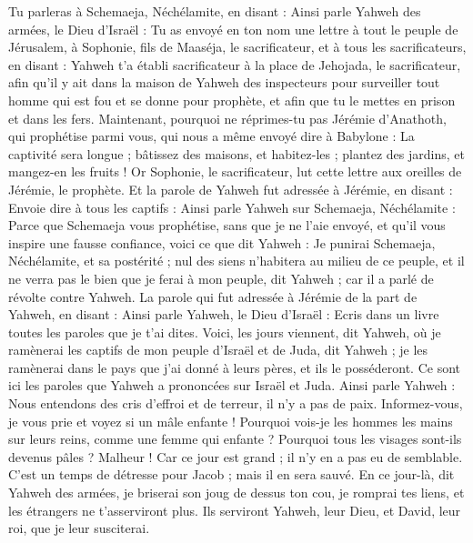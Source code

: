 \begin{multicols}{2}
Tu parleras à Schemaeja, Néchélamite, en disant :
Ainsi parle Yahweh des armées, le Dieu d'Israël : Tu as envoyé en ton nom une lettre à tout le peuple de Jérusalem, à Sophonie, fils de Maaséja, le sacrificateur, et à tous les sacrificateurs, en disant :
Yahweh t'a établi sacrificateur à la place de Jehojada, le sacrificateur, afin qu'il y ait dans la maison de Yahweh des inspecteurs pour surveiller tout homme qui est fou et se donne pour prophète, et afin que tu le mettes en prison et dans les fers.
Maintenant, pourquoi ne réprimes-tu pas Jérémie d'Anathoth, qui prophétise parmi vous,
qui nous a même envoyé dire à Babylone : La captivité sera longue ; bâtissez des maisons, et habitez-les ; plantez des jardins, et mangez-en les fruits !
Or Sophonie, le sacrificateur, lut cette lettre aux oreilles de Jérémie, le prophète.
Et la parole de Yahweh fut adressée à Jérémie, en disant :
Envoie dire à tous les captifs : Ainsi parle Yahweh sur Schemaeja, Néchélamite : Parce que Schemaeja vous prophétise, sans que je ne l'aie envoyé, et qu'il vous inspire une fausse confiance,
voici ce que dit Yahweh : Je punirai Schemaeja, Néchélamite, et sa postérité ; nul des siens n'habitera au milieu de ce peuple, et il ne verra pas le bien que je ferai à mon peuple, dit Yahweh ; car il a parlé de révolte contre Yahweh.
\VerseOne{}La parole qui fut adressée à Jérémie de la part de Yahweh, en disant :
Ainsi parle Yahweh, le Dieu d'Israël : Ecris dans un livre toutes les paroles que je t'ai dites.
Voici, les jours viennent, dit Yahweh, où je ramènerai les captifs de mon peuple d'Israël et de Juda, dit Yahweh ; je les ramènerai dans le pays que j'ai donné à leurs pères, et ils le posséderont.
Ce sont ici les paroles que Yahweh a prononcées sur Israël et Juda.
Ainsi parle Yahweh : Nous entendons des cris d'effroi et de terreur, il n'y a pas de paix.
Informez-vous, je vous prie et voyez si un mâle enfante ! Pourquoi vois-je les hommes les mains sur leurs reins, comme une femme qui enfante ? Pourquoi tous les visages sont-ils devenus pâles ?
Malheur ! Car ce jour est grand ; il n'y en a pas eu de semblable. C'est un temps de détresse pour Jacob ; mais il en sera sauvé.
En ce jour-là, dit Yahweh des armées, je briserai son joug de dessus ton cou, je romprai tes liens, et les étrangers ne t'asserviront plus.
Ils serviront Yahweh, leur Dieu, et David, leur roi, que je leur susciterai.

\end{multicols}
